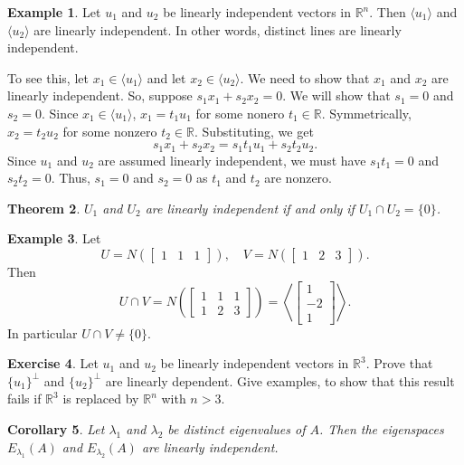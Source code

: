 \documentclass{amsart}
\newcommand{\RR}{\mathbb{R}}
\newtheorem{theorem}{Theorem}[section]
\newtheorem{corollary}[theorem]{Corollary}
\theoremstyle{definition}
\newtheorem{example}[theorem]{Example}
\newtheorem{exercise}[theorem]{Exercise}
\begin{document}
\begin{example}
  Let $u_1$ and $u_2$ be linearly independent vectors in $\RR^n$.
  Then $\langle u_1\rangle$ and $\langle u_2\rangle$ are linearly independent.
  In other words, distinct lines are linearly independent.

  To see this, let $x_1\in \langle u_1\rangle$ and let $x_2\in \langle u_2\rangle$.
  We need to show that $x_1$ and $x_2$ are linearly independent.
  So, suppose $s_1x_1+s_2x_2=0$. We will show that $s_1=0$ and $s_2=0$.
  Since $x_1\in \langle u_1\rangle$, $x_1=t_1u_1$ for some nonero $t_1\in\RR$.
  Symmetrically, $x_2 = t_2u_2$ for some nonzero $t_2\in \RR$. Substituting, we get
  $$
  s_1x_1 + s_2x_2 = s_1t_1u_1 + s_2t_2u_2.
  $$
  Since $u_1$ and $u_2$ are assumed linearly independent, we must have $s_1t_1=0$ and $s_2t_2=0$.
  Thus, $s_1=0$ and $s_2=0$ as $t_1$ and $t_2$ are nonzero.
\end{example}

\begin{theorem}
  $U_1$ and $U_2$ are linearly independent if and only if $U_1\cap U_2 = \{0\}$.
\end{theorem}

\begin{example}
Let 
$$U = N\left(\begin{bmatrix}1&1&1\end{bmatrix}\right),\quad
V=N\left(\begin{bmatrix}1&2&3\end{bmatrix}\right).$$
  Then
  $$
  U\cap V = N\left(
    \begin{bmatrix}1&1&1\\1&2&3\end{bmatrix}
  \right) = 
\left\langle\begin{bmatrix}1\\-2\\1\end{bmatrix}\right\rangle.
  $$
  In particular $U\cap V\neq \{0\}$.
\end{example}

\begin{exercise}
  Let $u_1$ and $u_2$ be linearly independent vectors in $\RR^3$.
  Prove that $\{u_1\}^\perp$ and $\{u_2\}^\perp$ are linearly dependent.
  Give examples, to show that this result fails if $\RR^3$ is replaced by $\RR^n$ with $n>3$.
\end{exercise}

 \begin{corollary}
  Let $\lambda_1$ and $\lambda_2$ be distinct eigenvalues of $A$. Then the eigenspaces $E_{\lambda_1}(A)$ and $E_{\lambda_2}(A)$ are linearly independent.
 \end{corollary}
\end{document}
